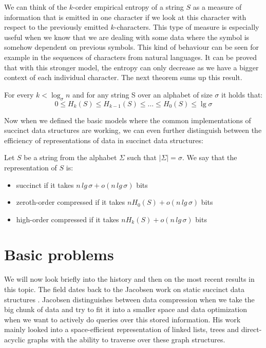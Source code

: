 We can think of the $k$-order empirical entropy of a string $S$ as a measure of information that is emitted in one character if we look at this character with respect to the previously emitted $k$-characters. This type of measure is especially useful when we know that we are dealing with some data where the symbol is somehow dependent on previous symbols. This kind of behaviour can be seen for example in the sequences of characters from natural languages. It can be proved that with this stronger model, the entropy can only decrease as we have a bigger context of each individual character. The next theorem sums up this result.

\begin{theorem}
For every $k<\log_{\sigma}n$ and for any string S over an alphabet of size $\sigma$ it holds that:
$$0\leq H_{k}(S)\leq H_{k-1}(S)\leq \ldots\leq H_0(S) \leq \lg \sigma$$
\end{theorem}

Now when we defined the basic models where the common implementations of succinct data structures are working, we can even further distinguish between the efficiency of representations of data in succinct data structures:

\begin{definition}
Let $S$ be a string from the alphabet $\Sigma$ such that $|\Sigma|=\sigma$. We say that the representation of $S$ is:
\begin{itemize}
    \item succinct if it takes $n\,lg\,\sigma + o(n\,lg\,\sigma)$ bits
    \item zeroth-order compressed if it takes $nH_0(S) + o(n\,lg\,\sigma)$ bits
    \item high-order compressed if it takes $nH_k(S) + o(n\,lg\,\sigma)$ bits
\end{itemize}
\end{definition}

\section{Basic problems}

We will now look briefly into the history and then on the most recent results in this topic. The field dates back to the Jacobsen work on static succinct data structures \cite{jacobson1988succinct}. Jacobsen distinguishes between data compression when we take the big chunk of data and try to fit it into a smaller space and
data optimization when we want to actively do queries over this stored information. His work mainly looked into a space-efficient representation of linked lists, trees and direct-acyclic graphs with the ability to traverse over these graph structures.

